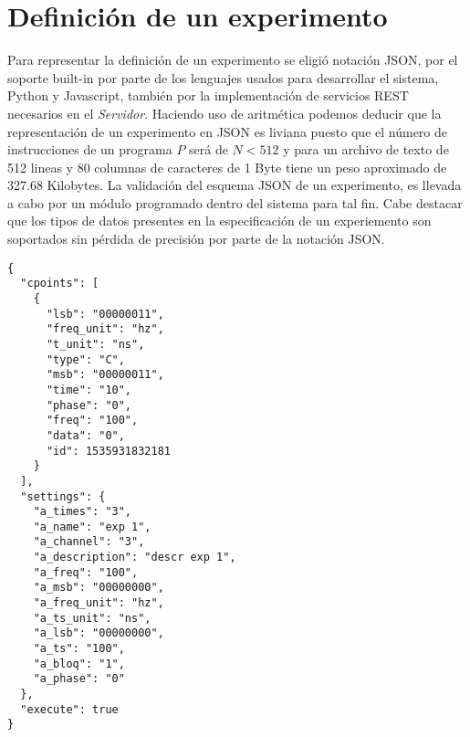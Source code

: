 \section{Definici\'on de un experimento}

Para representar la definici\'on de un experimento se eligi\'o notaci\'on JSON, 
por el soporte built-in por parte de los lenguajes usados para desarrollar el sistema, 
Python y Javascript, tambi\'en por la implementaci\'on de servicios REST necesarios 
en el \textit{Servidor}\cite{json_standar}.
Haciendo uso de aritm\'etica podemos deducir que la representaci\'on de un experimento en JSON
es liviana puesto que el n\'umero de instrucciones de un programa \(P\) ser\'a de \(N < 512 \) 
y para un archivo de texto de 512 lineas y 80 columnas de caracteres de 1 Byte 
tiene un peso aproximado de 327.68 Kilobytes.
La validaci\'on del esquema JSON de un experimento, es llevada a cabo por un m\'odulo programado
dentro del sistema para tal fin.
Cabe destacar que los tipos de datos presentes en la especificaci\'on de un experiemento son
soportados sin p\'erdida de precisi\'on por parte de la notaci\'on JSON.\cite{json_ref}


\begin{lstlisting}
{
  "cpoints": [
    {
      "lsb": "00000011",
      "freq_unit": "hz",
      "t_unit": "ns",
      "type": "C",
      "msb": "00000011",
      "time": "10",
      "phase": "0",
      "freq": "100",
      "data": "0",
      "id": 1535931832181
    }
  ],
  "settings": {
    "a_times": "3",
    "a_name": "exp 1",
    "a_channel": "3",
    "a_description": "descr exp 1",
    "a_freq": "100",
    "a_msb": "00000000",
    "a_freq_unit": "hz",
    "a_ts_unit": "ns",
    "a_lsb": "00000000",
    "a_ts": "100",
    "a_bloq": "1",
    "a_phase": "0"
  },
  "execute": true
}
\end{lstlisting}

\newpage

